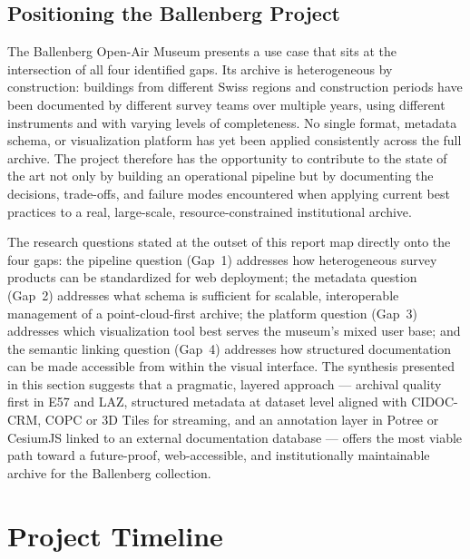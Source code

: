 \documentclass[]{report}
\begin{document}
\subsection{Positioning the Ballenberg Project}

The Ballenberg Open-Air Museum presents a use case that sits at the intersection of all
four identified gaps. Its archive is heterogeneous by construction: buildings from different
Swiss regions and construction periods have been documented by different survey teams over
multiple years, using different instruments and with varying levels of completeness. No single
format, metadata schema, or visualization platform has yet been applied consistently across
the full archive. The project therefore has the opportunity to contribute to the state of
the art not only by building an operational pipeline but by documenting the decisions,
trade-offs, and failure modes encountered when applying current best practices to a real,
large-scale, resource-constrained institutional archive.

The research questions stated at the outset of this report map directly onto the four gaps:
the pipeline question (Gap~1) addresses how heterogeneous survey products can be standardized
for web deployment; the metadata question (Gap~2) addresses what schema is sufficient for
scalable, interoperable management of a point-cloud-first archive; the platform question (Gap~3) addresses
which visualization tool best serves the museum's mixed user base; and the semantic linking
question (Gap~4) addresses how structured documentation can be made accessible from within
the visual interface. The synthesis presented in this section suggests that a pragmatic,
layered approach --- archival quality first in E57 and LAZ, structured metadata at dataset
level aligned with CIDOC-CRM, COPC or 3D Tiles for streaming, and an annotation layer in
Potree or CesiumJS linked to an external documentation database --- offers the most viable
path toward a future-proof, web-accessible, and institutionally maintainable archive for
the Ballenberg collection.

\section*{Project Timeline}
\label{sec:timeline}
\end{document}

